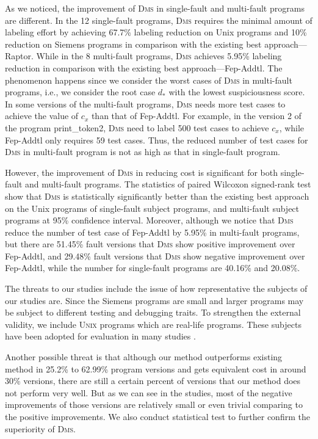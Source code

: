 As we noticed, the improvement of \textsc{Dms} in single-fault and multi-fault programs are different. In the 12 single-fault programs,  \textsc{Dms} requires the minimal amount of labeling effort by achieving 67.7\% labeling reduction on Unix programs and 10\% reduction on Siemens programs in comparison with the existing best approach---Raptor. While in the 8 multi-fault programs, \textsc{Dms} achieves 5.95\% labeling reduction in comparison with the existing best approach---Fep-Addtl. The phenomenon happens since we consider the worst cases of \textsc{Dms} in multi-fault programs, i.e., we consider the root case $d_*$ with the lowest suspiciousness score. In some versions of the multi-fault programs, \textsc{Dms} needs more test cases to achieve the value of $c_x$ than that of Fep-Addtl. For example, in the version 2 of the program print\_token2, \textsc{Dms} need to label 500 test cases to achieve $c_x$, while Fep-Addtl only requires 59 test cases. Thus, the reduced number of test cases for \textsc{Dms} in multi-fault program is not as high as that in single-fault program.

However, the improvement of \textsc{Dms} in reducing cost is significant for both single-fault and multi-fault programs. The statistics of  paired Wilcoxon signed-rank test show that \textsc{Dms} is statistically significantly better than the existing best approach on the Unix programs of single-fault subject programs, and multi-fault subject programs at 95\% confidence interval. Moreover, although we notice that \textsc{Dms} reduce the number of test case of Fep-Addtl by 5.95\% in multi-fault programs, but there are 51.45\% fault versions that \textsc{Dms} show positive improvement over Fep-Addtl, and  29.48\% fault versions that \textsc{Dms} show negative improvement over Fep-Addtl, while the number for single-fault programs are 40.16\% and 20.08\%.


The threats to our studies include the issue of how
representative the subjects of our studies are. Since the Siemens programs
are small and larger programs may be subject to different testing and debugging traits.
To strengthen the external validity, we include \textsc{Unix} programs which are
real-life programs. These subjects have been adopted for evaluation in many
studies \citep[e.g.][]{JH05,Abreu:2009.jss,DBLP:conf/icse/SantelicesJYH09}.

Another possible threat is that although our method outperforms existing method
in 25.2\% to 62.99\% program versions and gets equivalent cost in around 30\% versions,
there are still a certain percent of versions that our method does not perform very well.
But as we can see in the studies, most of the negative improvements of those versions
are relatively small or even trivial comparing to the positive improvements. We also
conduct statistical test to further confirm the superiority of \textsc{Dms}.

